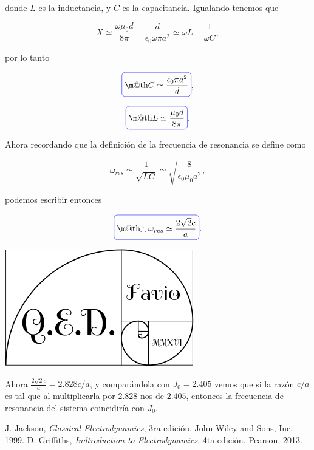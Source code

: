 \documentclass[a4paper,11pt]{article}
\makeatletter
\numberwithin{equation}{section}
\newcommand*{\boxcolor}{blue}
\renewcommand{\boxed}[1]{\textcolor{\boxcolor}{%
\tikz[baseline={([yshift=-1ex]current bounding box.center)}] \node [rectangle, minimum width=1ex,rounded corners,draw] {\normalcolor\m@th$\displaystyle#1$};}}
\makeatother
\begin{document}
donde $L$ es la inductancia, y $C$ es la capacitancia. Igualando tenemos que 

\begin{equation}
 X \simeq \frac{\omega \mu_0 d}{8\pi} - \frac{d}{\epsilon_0 \omega \pi a^2} \simeq 
 \omega L - \frac{1}{\omega C},
\end{equation}

por lo tanto 

\begin{equation}
 \boxed{C \simeq \frac{\epsilon_0\pi a^2}{d}},
\end{equation}

\begin{equation}
 \boxed{L \simeq \frac{\mu_0d}{8\pi}}.
\end{equation}

Ahora recordando que la definición de la frecuencia de resonancia se define como 

\begin{equation}
 \omega_{res} \simeq \frac{1}{\sqrt{LC}} \simeq \sqrt{\frac{8}{\epsilon_0\mu_0 a^2}},
\end{equation}

podemos escribir entonces 

\begin{equation}
 \boxed{\therefore \omega_{res} \simeq \frac{2\sqrt{2}c}{a}}.
\end{equation}

\hspace{10cm}\includegraphics[scale=0.25]{logoQED}

Ahora $\frac{2\sqrt{2}c}{a} = 2.828 c/a$, y comparándola con $J_0 = 2.405$ vemos que 
si la razón $c/a$ es tal que al multiplicarla por $2.828$ nos de $2.405$, entonces 
la frecuencia de resonancia del sistema coincidiría con $J_0$.

\newpage

\begin{thebibliography}{10}
J. Jackson, \emph{Classical Electrodynamics}, 3ra edición. John Wiley and Sons, Inc. 
1999.
D. Griffiths, \emph{Indtroduction to Electrodynamics}, 4ta edición. Pearson, 2013.
\end{thebibliography}
\end{document}
